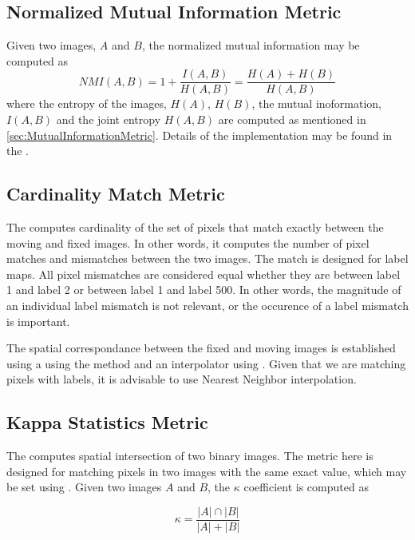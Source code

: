 \subsection{Normalized Mutual Information Metric}
Given two images, $A$ and $B$, the normalized mutual information may be computed as 
\begin{equation}
NMI(A,B) = 1 + \frac{I(A,B)}{H(A,B)} = \frac{H(A) + H(B)}{H(A,B)}
\end{equation}
where the entropy of the images, $H(A)$, $H(B)$, the mutual 
inoformation, $I(A,B)$ and the joint entropy $H(A,B)$ are computed as mentioned 
in \ref{sec:MutualInformationMetric}. Details of the implementation may be found in 
the \cite{Hajnal2001}.

\subsection{Cardinality Match Metric}
The  computes cardinality of the set of pixels 
that match exactly between the moving and fixed images. In other words, it computes the 
number of pixel matches and mismatches between the two images. The match is designed for 
label maps. All pixel mismatches are considered equal whether they are between label 1 
and label 2 or between label 1 and label 500. In other words, the magnitude of an 
individual label mismatch is not relevant, or the occurence of a label mismatch 
is important. 

The spatial correspondance between the fixed and moving images is established using 
a  using the  method and an interpolator 
using . Given that we are matching pixels with labels, 
it is advisable to use Nearest Neighbor interpolation.

\subsection{Kappa Statistics Metric}
The  computes spatial intersection of 
two binary images. The metric here is designed for matching pixels in two images 
with the same exact value, which may be set using . 
Given two images $A$ and $B$, the $\kappa$ coefficient is computed as
 
\begin{equation}
\kappa = \frac{|A| \cap |B|}{|A| + |B|}
\end{equation}

